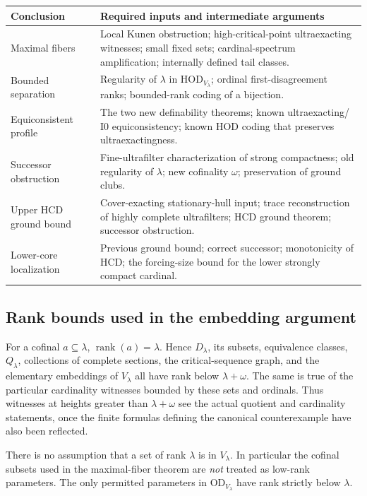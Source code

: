 \documentclass[11pt,letterpaper]{article}
\theoremstyle{definition}
\numberwithin{equation}{section}
\newcommand{\HOD}{\mathrm{HOD}}
\newcommand{\OD}{\mathrm{OD}}
\newcommand{\rank}{\operatorname{rank}}
\newcommand{\Izero}{\mathrm{I0}}
\begin{document}
\begin{center}
\small
\renewcommand{\arraystretch}{1.18}
\begin{tabularx}{\textwidth}{@{}P{.27\textwidth}Y@{}}
\toprule
\textbf{Conclusion}&\textbf{Required inputs and intermediate arguments}\\
\midrule
Maximal fibers&Local Kunen obstruction; high-critical-point ultraexacting witnesses; small fixed sets; cardinal-spectrum amplification; internally defined tail classes.\\[4pt]
Bounded separation&Regularity of $\lambda$ in $\HOD_{V_\lambda}$; ordinal first-disagreement ranks; bounded-rank coding of a bijection.\\[4pt]
Equiconsistent profile&The two new definability theorems; known ultraexacting/$\Izero$ equiconsistency; known HOD coding that preserves ultraexactingness.\\[4pt]
Successor obstruction&Fine-ultrafilter characterization of strong compactness; old regularity of $\lambda$; new cofinality $\omega$; preservation of ground clubs.\\[4pt]
Upper HCD ground bound&Cover-exacting stationary-hull input; trace reconstruction of highly complete ultrafilters; HCD ground theorem; successor obstruction.\\[4pt]
Lower-core localization&Previous ground bound; correct successor; monotonicity of HCD; the forcing-size bound for the lower strongly compact cardinal.\\
\bottomrule
\end{tabularx}
\end{center}

\subsection{Rank bounds used in the embedding argument}

For a cofinal $a\subseteq\lambda$, $\rank(a)=\lambda$. Hence $D_\lambda$, its subsets, equivalence classes, $Q_\lambda$, collections of complete sections, the critical-sequence graph, and the elementary embeddings of $V_\lambda$ all have rank below $\lambda+\omega$. The same is true of the particular cardinality witnesses bounded by these sets and ordinals. Thus witnesses at heights greater than $\lambda+\omega$ see the actual quotient and cardinality statements, once the finite formulas defining the canonical counterexample have also been reflected.

There is no assumption that a set of rank $\lambda$ is in $V_\lambda$. In particular the cofinal subsets used in the maximal-fiber theorem are \emph{not} treated as low-rank parameters. The only permitted parameters in $\OD_{V_\lambda}$ have rank strictly below $\lambda$.
\end{document}
